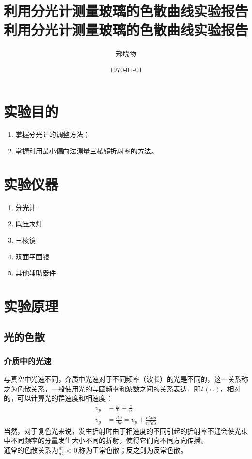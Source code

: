 \documentclass[UTF8]{ctexart}
\title{利用分光计测量玻璃的色散曲线实验报告}
\title{利用分光计测量玻璃的色散曲线实验报告}
\author{郑晓旸}
\date{\today}
\begin{document}
\fancyfoot[C]{\thepage}

\maketitle
\tableofcontents
\newpage

\section{实验目的}
    \begin{enumerate}
            \item 掌握分光计的调整方法；
            \item 掌握利用最小偏向法测量三棱镜折射率的方法。
    \end{enumerate} 


\section{实验仪器}
\begin{enumerate}
    \item 分光计
    \item 低压汞灯
    \item 三棱镜
    \item 双面平面镜
    \item 其他辅助器件
\end{enumerate}

\section{实验原理}
\subsection{光的色散}
\subsubsection{介质中的光速}
与真空中光速不同，介质中光速对于不同频率（波长）的光是不同的，这一关系称之为色散关系，一般使用光的与圆频率和波数之间的关系表达，即$k(\omega)$，相对的，可以计算光的群速度和相速度：\\
\begin{align}
    v_p&=\frac{\omega}{k}=\frac{c}{n}\\v_g&=\frac{d\omega}{dk}=v_p+\frac{c\lambda dn}{n^2d\lambda}
\end{align}
当然，对于复色光来说，发生折射时由于相速度的不同引起的折射率不通会使光束中不同频率的分量发生大小不同的折射，使得它们向不同方向传播。
\\
通常的色散关系为$\frac{dn}{d\lambda}<0$,称为正常色散；反之则为反常色散。
\end{document}
